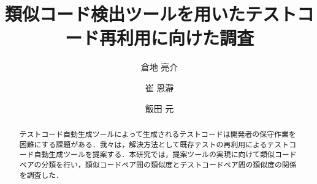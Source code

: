 \documentclass{fose2019}           %
\title{類似コード検出ツールを用いたテストコード再利用に向けた調査}
\author{倉地 亮介}{Ryosuke Kurachi, 奈良先端科学技術大学院大学}
\author{崔 恩瀞}{Eunjong Choi, 京都工芸繊維大学}
\author{飯田 元}{Hajimu Iida, 奈良先端科学技術大学院大学}
\begin{document}
\maketitle


\begin{abstract}
テストコード自動生成ツールによって生成されるテストコードは開発者の保守作業を困難にする課題がある．我々は，解決方法として既存テストの再利用によるテストコード自動生成ツールを提案する．本研究では，提案ツールの実現に向けて類似コードペアの分類を行い，類似コードペア間の類似度とテストコードペア間の類似度の関係を調査した．
\end{abstract}

\end{document}
